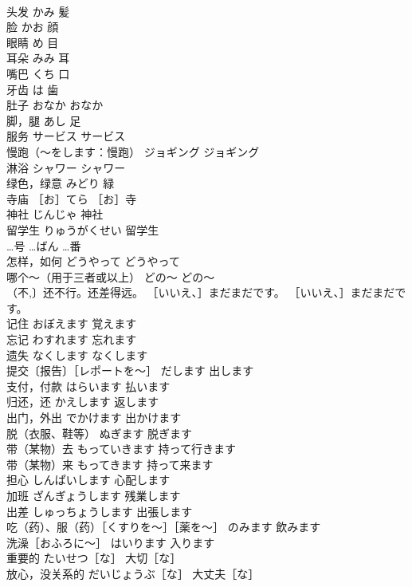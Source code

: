 \documentclass[8pt]{extreport}
\begin{document}
\begin{CJK}{UTF8}{min}
\\	头发	かみ	髪
\\	脸	かお	顔
\\	眼睛	め	目
\\	耳朵	みみ	耳
\\	嘴巴	くち	口
\\	牙齿	は	歯
\\	肚子	おなか	おなか
\\	脚，腿	あし	足
\\	服务	サービス	サービス
\\	慢跑（～をします：慢跑）	ジョギング	ジョギング
\\	淋浴	シャワー	シャワー
\\	绿色，绿意	みどり	緑
\\	寺庙	［お］てら	［お］寺
\\	神社	じんじゃ	神社
\\	留学生	りゅうがくせい	留学生
\\	…号	…ばん	…番
\\	怎样，如何	どうやって	どうやって
\\	哪个～（用于三者或以上）	どの～	どの～
\\	（不,〕还不行。还差得远。	［いいえ、］まだまだです。	［いいえ、］まだまだです。
\\	记住	おぼえます	覚えます
\\	忘记	わすれます	忘れます
\\	遗失	なくします	なくします
\\	提交〔报告〕［レポートを～］	だします	出します
\\	支付，付款	はらいます	払います
\\	归还，还	かえします	返します
\\	出门，外出	でかけます	出かけます
\\	脱（衣服、鞋等）	ぬぎます	脱ぎます
\\	带（某物）去	もっていきます	持って行きます
\\	带（某物）来	もってきます	持って来ます
\\	担心	しんぱいします	心配します
\\	加班	ざんぎょうします	残業します
\\	出差	しゅっちょうします	出張します
\\	吃（药）、服（药）［くすりを～］［薬を～］	のみます	飲みます
\\	洗澡［おふろに～］	はいります	入ります
\\	重要的	たいせつ［な］	大切［な］
\\	放心，没关系的	だいじょうぶ［な］	大丈夫［な］

\end{CJK}
\end{document}
